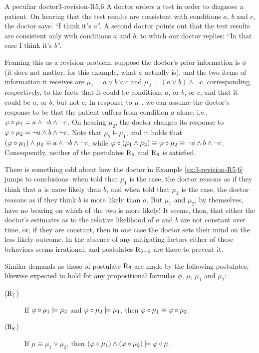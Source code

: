 \begin{xmpl}{A peculiar doctor}{3-revision-R5,6}
	A doctor orders a test in order to diagnose a patient.
	On hearing that the test results are consistent with conditions $a$, $b$ and $c$, 
	the doctor says: ``I think it's $a$''.
	A second doctor points out that the test results are consistent only with conditions $a$ and $b$,
	to which our doctor replies: ``In that case I think it's $b$''.

	Framing this as a revision problem, suppose the doctor's prior information is $\phi$ 
	(it does not matter, for this example, what $\phi$ actually is),
	and the two items of information it receives are $\mu_1= a\lor b\lor c$
	and $\mu_2=(a\lor b)\land \lnot c$, corresponding, respectively,
	to the facts that it could be conditions $a$, or $b$, or $c$,
	and that it could be $a$, or $b$, but not $c$.
	In response to $\mu_1$, we can assume the doctor's response to be that 
	the patient suffers from condition $a$ alone,
	i.e., $\varphi\circ\mu_1=a\land\lnot b\land \lnot c$.
	On hearing $\mu_2$, the doctor changes its response to 
	$\varphi\circ\mu_2=\lnot a \land b\land \lnot c$.
	Note that $\mu_2\models \mu_1$, and it holds that
	$(\varphi\circ\mu_1)\land\mu_2\equiv a\land\lnot b\land \lnot c$,
	while $\varphi\circ(\mu_1\land\mu_2)\equiv\varphi\circ\mu_2\equiv\lnot a \land b\land \lnot c$.
	Consequently, neither of the postulates $\mathrm{R}_{5}$ and $\mathrm{R}_{6}$ is satisfied.
\end{xmpl}

There is something odd about how the doctor in Example \ref{ex:3-revision-R5,6}
jumps to conclusions: when told that $\mu_1$ is the case, the doctor reasons as if they think that $a$ is more likely than $b$,
and when told that $\mu_2$ is the case, the doctor reasons as if they think $b$ is more likely than $a$. 
But $\mu_1$ and $\mu_2$, by themselves, have no bearing on which of the two is more likely! 
It seems, then, that either the doctor's estimates as to the relative likelihood of $a$ and $b$ 
are not constant over time, or, if they are constant, then in one case the doctor sets their mind on the less likely outcome. 
In the absence of any mitigating factors either of these behaviors seems irrational, and postulates $\mathrm{R}_{5-6}$ are there to prevent it. 

Similar demands as those of postulate $\mathrm{R}_{6}$ are made by the following postulates, 
likewise expected to hold for any propositional formulas $\phi$, $\mu$, $\mu_1$ and $\mu_2$: 

\begin{description}
	\item[($\mathrm{R}_{7}$)] If $\varphi\circ\mu_1\models\mu_2$ and $\varphi\circ\mu_2\models\mu_1$,
	then $\varphi\circ\mu_1\equiv\varphi\circ\mu_2$.
	\item[($\mathrm{R}_{8}$)] If $\mu\equiv\mu_{1}\lor\mu_{2}$,
		then $(\varphi\circ\mu_1)\land(\varphi\circ\mu_2)\models\varphi\circ\mu$.
\end{description}

